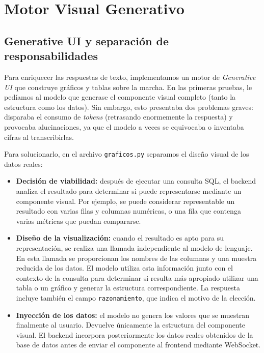\section{Motor Visual Generativo}
\subsection{Generative UI y separación de responsabilidades}

Para enriquecer las respuestas de texto, implementamos un motor de \textit{Generative UI} 
que construye gráficos y tablas sobre la marcha. En las primeras pruebas, le pedíamos al 
modelo que generase el componente visual completo (tanto la estructura como los datos). 
Sin embargo, esto presentaba dos problemas graves: disparaba el consumo de \textit{tokens} 
(retrasando enormemente la respuesta) y provocaba alucinaciones, ya que el modelo a veces 
se equivocaba o inventaba cifras al transcribirlas.

Para solucionarlo, en el archivo \texttt{graficos.py} separamos el diseño visual de los 
datos reales:

\begin{itemize}

    \item \textbf{Decisión de viabilidad:} después de ejecutar una consulta SQL,
    el backend analiza el resultado para determinar si puede representarse
    mediante un componente visual. Por ejemplo, se puede considerar
    representable un resultado con varias filas y columnas numéricas, o una
    fila que contenga varias métricas que puedan compararse.

    \item \textbf{Diseño de la visualización:} cuando el resultado es apto para
    su representación, se realiza una llamada independiente al modelo de
    lenguaje. En esta llamada se proporcionan los nombres de las columnas y
    una muestra reducida de los datos. El modelo utiliza esta información junto
    con el contexto de la consulta para determinar si resulta más apropiado
    utilizar una tabla o un gráfico y generar la estructura correspondiente.
    La respuesta incluye también el campo \texttt{razonamiento}, que indica el
    motivo de la elección.

    \item \textbf{Inyección de los datos:} el modelo no genera los valores que
    se muestran finalmente al usuario. Devuelve únicamente la estructura del
    componente visual. El backend incorpora posteriormente los datos reales
    obtenidos de la base de datos antes de enviar el componente al frontend
    mediante WebSocket.

\end{itemize}

